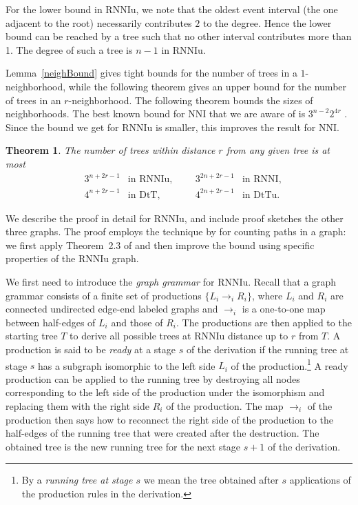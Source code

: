 \documentclass[11pt]{amsart}
\newtheorem{theorem}[lemma]{Theorem}
\theoremstyle{definition}
\newcommand{\nni}{\mathrm{NNI}}
\newcommand{\rnni}{\mathrm{RNNI}}
\newcommand{\rnniu}{\mathrm{RNNIu}}
\newcommand{\dtt}{\mathrm{DtT}}
\newcommand{\dttu}{\mathrm{DtTu}}
\begin{document}
For the lower bound in $\rnniu$, we note that the oldest event interval (the one adjacent to the root) necessarily contributes $2$ to the degree.
Hence the lower bound can be reached by a tree such that no other interval contributes more than 1.
The degree of such a tree is $n-1$ in $\rnniu$.
\endproof

Lemma~\ref{neighBound} gives tight bounds for the number of trees in a $1$-neighborhood, while the following theorem gives an upper bound for the number of trees in an $r$-neighborhood.
The following theorem bounds the sizes of neighborhoods.
The best known bound for $\nni$ that we are aware of is $3^{n-2} 2^{4r}$ \autocite{li1996some}.
Since the bound we get for $\rnniu$ is smaller, this improves the result for $\nni$.

\begin{theorem}
\label{neighSizeTh}
The number of trees within distance $r$ from any given tree is at most
\begin{align*}
& 3^{n+2r-1}	& \mbox{in $\rnniu$,}
&&& 3^{2n+2r-1}	& \mbox{in $\rnni$,}\\
& 4^{n+2r-1}	& \mbox{in $\dtt$,}
&&& 4^{2n+2r-1}	& \mbox{in $\dttu$.}
\end{align*}
\end{theorem}

\proof
We describe the proof in detail for $\rnniu$, and include proof sketches the other three graphs.
The proof employs the technique by \textcite{Sleator1992-bp} for counting paths in a graph: we first apply Theorem~2.3 of \textcite{Sleator1992-bp} and then improve the bound using specific properties of the $\rnniu$ graph.

We first need to introduce the \emph{graph grammar} for $\rnniu$.
Recall that a graph grammar consists of a finite set of productions $\{L_i \to_i R_i\}$, where $L_i$ and $R_i$ are connected undirected edge-end labeled graphs and $\to_i$ is a one-to-one map between half-edges of $L_i$ and those of $R_i$.
The productions are then applied to the starting tree $T$ to derive all possible trees at $\rnniu$ distance up to $r$ from $T$.
A production is said to be \emph{ready} at a stage $s$ of the derivation if the running tree at stage $s$ has a subgraph isomorphic to the left side $L_i$ of the production.\footnote{
By a \emph{running tree at stage $s$} we mean the tree obtained after $s$ applications of the production rules in the derivation.}
A ready production can be applied to the running tree by destroying all nodes corresponding to the left side of the production under the isomorphism and replacing them with the right side $R_i$ of the production.
The map $\to_i$ of the production then says how to reconnect the right side of the production to the half-edges of the running tree that were created after the destruction.
The obtained tree is the new running tree for the next stage $s+1$ of the derivation.
\end{document}
